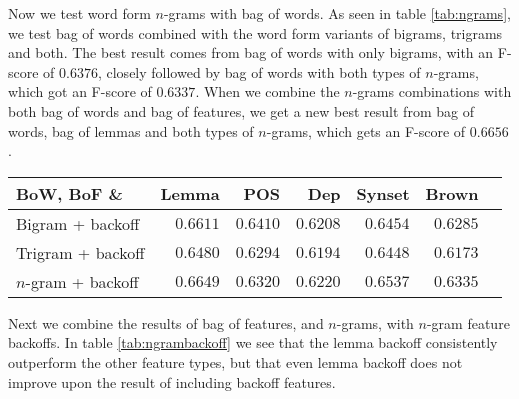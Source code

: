 \documentclass[11pt,letterpaper]{article}
\begin{document}
Now we test word form $n$-grams with bag of words. As seen in table \ref{tab:ngrams}, we test bag of words combined with the word form variants of bigrams, trigrams and both. The best result comes from bag of words with only bigrams, with an F-score of $0.6376$, closely followed by bag of words with both types of $n$-grams, which got an F-score of $0.6337$. When we combine the $n$-grams combinations with both bag of words and bag of features, we get a new best result from bag of words, bag of lemmas and both types of $n$-grams, which gets an F-score of $0.6656$.

\begin{table*}
  \begin{center}
    \begin{tabular}{lrrrrrr}
      \toprule
      BoW, BoF \& & Lemma & POS & Dep & Synset & Brown\\
      \midrule
      Bigram + backoff & $0.6611$ & $0.6410$  & $0.6208$ & $0.6454$ & $0.6285$\\ %
      Trigram + backoff & $0.6480$ & $0.6294$ & $0.6194$ & $0.6448$ & $0.6173$ \\ %
      $n$-gram + backoff & $0.6649$ & $0.6320$ & $0.6220$ & $0.6537$ & $0.6335$\\ %
      
      \bottomrule

    \end{tabular}
  \end{center}
  \caption{Bag of words, bag of features and different combinations of $n$-grams with feature backoff. Each backoff combination is the one that achieved the best result.}
  \label{tab:ngrambackoff}
\end{table*}

Next we combine the results of bag of features, and $n$-grams, with $n$-gram feature backoffs. In table \ref{tab:ngrambackoff} we see that the lemma backoff consistently outperform the other feature types, but that even lemma backoff does not improve upon the result of including backoff features.
\end{document}
